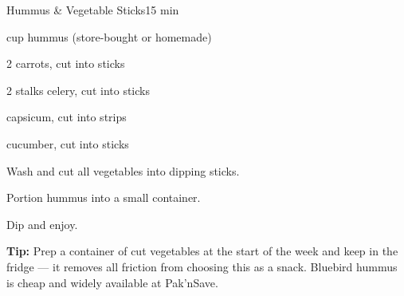 \begin{recipebox}{Hummus \& Vegetable Sticks}{1}{5 min}
\begin{ingredients}
  \item \textonehalf{} cup hummus (store-bought or homemade)
  \item 2 carrots, cut into sticks
  \item 2 stalks celery, cut into sticks
  \item \textonehalf{} capsicum, cut into strips
  \item \textonehalf{} cucumber, cut into sticks
\end{ingredients}

\begin{method}
  \item Wash and cut all vegetables into dipping sticks.
  \item Portion hummus into a small container.
  \item Dip and enjoy.
\end{method}


\begin{notelist}
  \item \textbf{Tip:} Prep a container of cut vegetables at the start of the week and keep in the fridge --- it removes all friction from choosing this as a snack. Bluebird hummus is cheap and widely available at Pak'nSave.
\end{notelist}
\end{recipebox}
